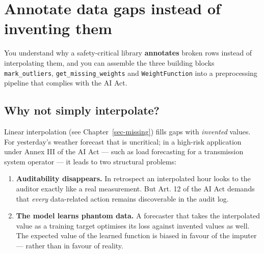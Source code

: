 \documentclass[
  english,
  letterpaper,
]{scrbook}
\providecommand{\tightlist}{%
  \setlength{\itemsep}{0pt}\setlength{\parskip}{0pt}}
\begin{document}

\chapter{Annotate data gaps instead of inventing
them}\label{sec-annotation}

\begin{tcolorbox}[enhanced jigsaw, arc=.35mm, bottomrule=.15mm, bottomtitle=1mm, breakable, colback=white, colbacktitle=quarto-callout-note-color!10!white, colframe=quarto-callout-note-color-frame, coltitle=black, left=2mm, leftrule=.75mm, opacityback=0, opacitybacktitle=0.6, rightrule=.15mm, title=\textcolor{quarto-callout-note-color}{\faInfo}\hspace{0.5em}{Learning objective}, titlerule=0mm, toprule=.15mm, toptitle=1mm]

You understand why a safety-critical library \textbf{annotates} broken
rows instead of interpolating them, and you can assemble the three
building blocks \texttt{mark\_outliers}, \texttt{get\_missing\_weights}
and \texttt{WeightFunction} into a preprocessing pipeline that complies
with the AI Act.

\end{tcolorbox}

\section{Why not simply interpolate?}\label{why-not-simply-interpolate}

Linear interpolation (see Chapter~\ref{sec-missing}) fills gaps with
\emph{invented} values. For yesterday's weather forecast that is
uncritical; in a high-risk application under Annex III of the AI Act ---
such as load forecasting for a transmission system operator --- it leads
to two structural problems:

\begin{enumerate}
\def\labelenumi{\arabic{enumi}.}
\tightlist
\item
  \textbf{Auditability disappears.} In retrospect an interpolated hour
  looks to the auditor exactly like a real measurement. But Art. 12 of
  the AI Act demands that \emph{every} data-related action remains
  discoverable in the audit log.
\item
  \textbf{The model learns phantom data.} A forecaster that takes the
  interpolated value as a training target optimises its loss against
  invented values as well. The expected value of the learned function is
  biased in favour of the imputer --- rather than in favour of reality.
\end{enumerate}
\end{document}
